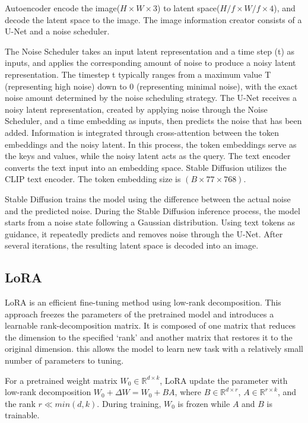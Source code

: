 \documentclass[extendedabs]{bmvc2k}
\begin{document}
Autoencoder encode the image($H\times W\times 3$) to latent space($H/f \times W/f \times 4$), and decode the latent space to the image. The image information creator consists of a U-Net and a noise scheduler. 

The Noise Scheduler takes an input latent representation and a time step (t) as inputs, and applies the corresponding amount of noise to produce a noisy latent representation. The timestep t typically ranges from a maximum value T (representing high noise) down to 0 (representing minimal noise), with the exact noise amount determined by the noise scheduling strategy. The U-Net receives a noisy latent representation, created by applying noise through the Noise Scheduler, and a time embedding as inputs, then predicts the noise that has been added. Information is integrated through cross-attention between the token embeddings and the noisy latent. In this process, the token embeddings serve as the keys and values, while the noisy latent acts as the query. The text encoder converts the text input into an embedding space. Stable Diffusion utilizes the CLIP \cite{clip} text encoder. The token embedding size is $(B \times 77 \times 768)$.

Stable Diffusion trains the model using the difference between the actual noise and the predicted noise. During the Stable Diffusion inference process, the model starts from a noise state following a Gaussian distribution. Using text tokens as guidance, it repeatedly predicts and removes noise through the U-Net. After several iterations, the resulting latent space is decoded into an image.
\subsection{LoRA}
LoRA\cite{lora} is an efficient fine-tuning method using low-rank decomposition. This approach freezes the parameters of the pretrained model and introduces a learnable rank-decomposition matrix. It is composed of one matrix that reduces the dimension to the specified ‘rank’ and another matrix that restores it to the original dimension. this allows the model to learn new task with a relatively small number of parameters to tuning.

For a pretrained weight matrix $W_0\in \mathbb{R}^{d\times k}$, LoRA update the parameter with low-rank decomposition $W_0 + \Delta W=W_0+BA$, where $B\in \mathbb{R}^{d\times r}$,  $A\in \mathbb{R}^{r\times k}$, and the rank $r \ll min(d,k)$. During training, $W_0$ is frozen while $A$ and $B$ is trainable.
\end{document}
